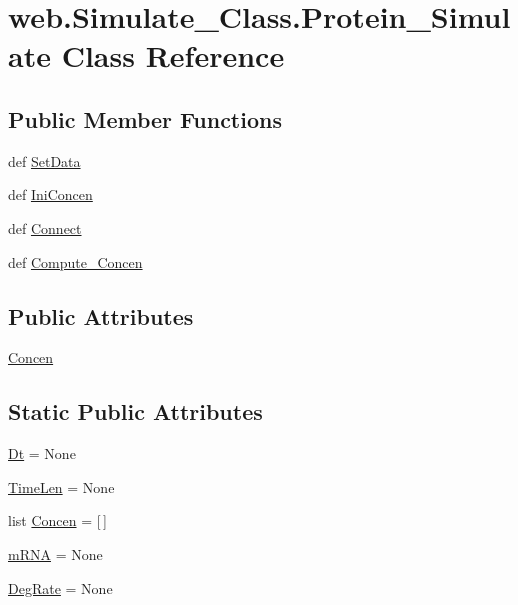 \hypertarget{classweb_1_1_simulate___class_1_1_protein___simulate}{\section{web.\-Simulate\-\_\-\-Class.\-Protein\-\_\-\-Simulate Class Reference}
\label{classweb_1_1_simulate___class_1_1_protein___simulate}
}
\subsection*{Public Member Functions}
\begin{DoxyCompactItemize}
\item 
def \hyperlink{classweb_1_1_simulate___class_1_1_protein___simulate_aed90abad02aad5dc6ac31a344032b8c8}{Set\-Data}
\item 
def \hyperlink{classweb_1_1_simulate___class_1_1_protein___simulate_a25ef40b09e3b2ad608d7fd32dfbbc552}{Ini\-Concen}
\item 
def \hyperlink{classweb_1_1_simulate___class_1_1_protein___simulate_ad8e95c5ff42680746fd7f0e66dfefa95}{Connect}
\item 
def \hyperlink{classweb_1_1_simulate___class_1_1_protein___simulate_ac7de7384d587c3bc575e762ad40d8446}{Compute\-\_\-\-Concen}
\end{DoxyCompactItemize}
\subsection*{Public Attributes}
\begin{DoxyCompactItemize}
\item 
\hyperlink{classweb_1_1_simulate___class_1_1_protein___simulate_ac37e685db664715fb1f7a71d9064d80d}{Concen}
\end{DoxyCompactItemize}
\subsection*{Static Public Attributes}
\begin{DoxyCompactItemize}
\item 
\hyperlink{classweb_1_1_simulate___class_1_1_protein___simulate_a989acf6cadfdaf26684d13f36dc63adb}{Dt} = None
\item 
\hyperlink{classweb_1_1_simulate___class_1_1_protein___simulate_a50edacbd205b198ab95cdb5fc7f9635e}{Time\-Len} = None
\item 
list \hyperlink{classweb_1_1_simulate___class_1_1_protein___simulate_a446c78bb62c53d12797f4e15e634b4ac}{Concen} = \mbox{[}$\,$\mbox{]}
\item 
\hyperlink{classweb_1_1_simulate___class_1_1_protein___simulate_a7b63979d25ab27dceed5ec84fb2d1345}{m\-R\-N\-A} = None
\item 
\hyperlink{classweb_1_1_simulate___class_1_1_protein___simulate_adbb5f457e3feae482778dd6fe5ff7788}{Deg\-Rate} = None
\end{DoxyCompactItemize}


